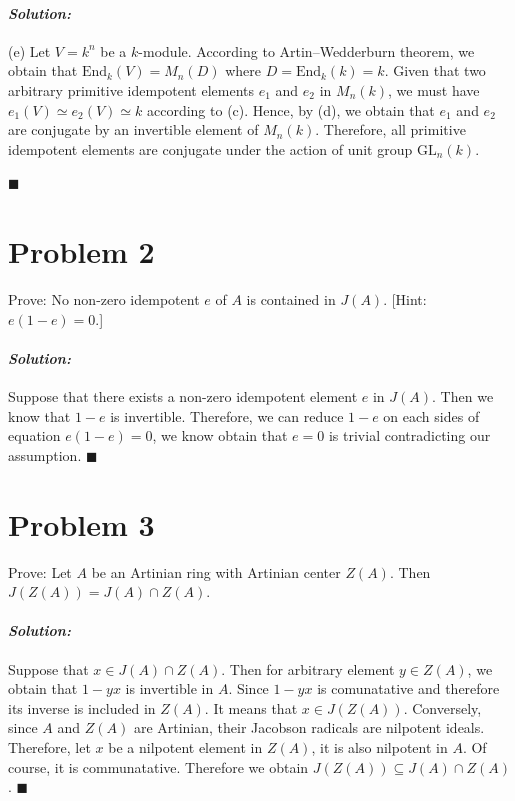 \documentclass[12pt, a4paper]{article}
\theoremstyle{remark}
\newenvironment{solution}
  {\paragraph{\textit{Solution:}}\par\medskip}
  {\hfill$\blacksquare$\vspace{0.1cm}}
\begin{document}
\begin{solution}
    (e) Let $V=k^n$ be a $k$-module. According to Artin–Wedderburn theorem, we obtain that $\text{End}_k(V)= M_n(D)$ where $D=\text{End}_k(k)=k$. Given that two arbitrary primitive idempotent elements $e_1$ and $e_2$ in $M_n(k)$, we must have $e_1(V)\simeq e_2(V)\simeq k$ according to (c).
    Hence, by (d), we obtain that $e_1$ and $e_2$ are conjugate by an invertible element of $M_n(k)$.
    Therefore, all primitive idempotent elements are conjugate under the action of unit group $\text{GL}_n(k)$.

    
    
\end{solution}


\section*{Problem 2}
Prove: No non-zero idempotent $e$ of $A$ is contained in $J(A)$. [Hint: $e(1 - e) = 0$.]

\begin{solution}
    Suppose that there exists a non-zero idempotent element $e$ in $J(A)$. Then we know that $1-e$ is invertible.
    Therefore, we can reduce $1-e$ on each sides of equation $e(1-e)=0$, we know obtain that $e=0$ is trivial contradicting our assumption.
\end{solution}

\section*{Problem 3}
Prove: Let $A$ be an Artinian ring with Artinian center $Z(A)$. Then $J(Z(A)) = J(A) \cap Z(A)$.
\begin{solution}
    Suppose that $x\in J(A)\cap Z(A)$. Then for arbitrary element $y\in Z(A)$, we obtain that $1-yx$ is invertible in $A$.
    Since $1-yx$ is comunatative and therefore its inverse is included in $Z(A)$. It means that $x\in J(Z(A))$. 
    Conversely, since $A$ and $Z(A)$ are Artinian, their Jacobson radicals are nilpotent ideals. Therefore, let $x$ be a nilpotent element in $Z(A)$, it is also nilpotent in $A$.
    Of course, it is communatative.
    Therefore we obtain $J(Z(A))\subseteq J(A)\cap Z(A)$.
\end{solution}



\end{document}
